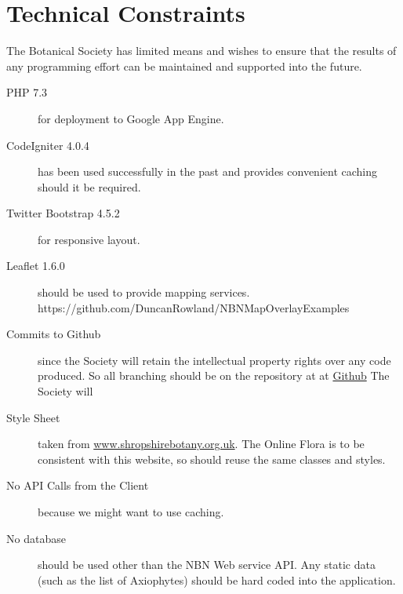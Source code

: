 \documentclass[a4paper,12pt,landscape]{article}
\begin{document}
\section{Technical Constraints}


The Botanical Society has limited means
and wishes to ensure that the results of any programming effort
can be maintained and supported
into the future.

\begin{description}
    \item[PHP 7.3] for deployment to Google App Engine.
    \item[CodeIgniter 4.0.4] has been used successfully in the past and provides convenient caching should it be required.
    \item[Twitter Bootstrap 4.5.2] for responsive layout.
    \item[Leaflet 1.6.0] should be used to provide mapping services.
     https://github.com/DuncanRowland/NBNMapOverlayExamples
    \item[Commits to Github] since the Society will retain the intellectual property rights
      over any code produced.
      So all branching should be on the repository at
      at \href{https://github.com/joejcollins/captain-magenta.git}{Github}
      The Society will
    \item[Style Sheet] taken from \href{https://www.shropshirebotany.org.uk/}{www.shropshirebotany.org.uk}.
      The Online Flora is to be consistent with this website,
      so should reuse the same classes and styles.
    \item[No API Calls from the Client] because we might want to use caching.
    \item[No database] should be used other than the NBN Web service API.
      Any static data 
      (such as the list of Axiophytes)
      should be hard coded into the application.
\end{description}
\end{document}
